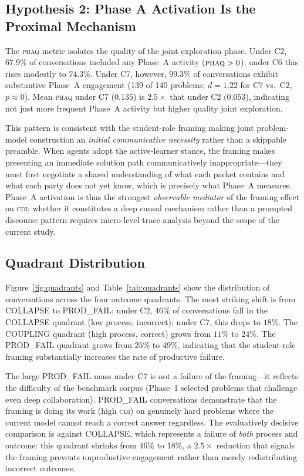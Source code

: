 \documentclass{article}
\newcommand{\CDI}{\textsc{cdi}}
\newcommand{\PhAQ}{\textsc{phaq}}
\begin{document}
\subsection{Hypothesis 2: Phase A Activation Is the Proximal Mechanism}

The \PhAQ{} metric isolates the quality of the joint exploration
phase. Under C2, $67.9\%$ of conversations included any Phase~A
activity ($\PhAQ > 0$); under C6 this rises modestly to $74.3\%$.
Under C7, however, $99.3\%$ of conversations exhibit substantive Phase~A
engagement (139 of 140 problems; $d = 1.22$ for C7 vs.\ C2,
$p \approx 0$). Mean \PhAQ{} under C7 ($0.135$) is $2.5\times$ that
under C2 ($0.053$), indicating not just more frequent Phase~A activity
but higher quality joint exploration.

This pattern is consistent with the student-role framing making joint
problem-model construction an \emph{initial communicative necessity}
rather than a skippable preamble. When agents adopt the active-learner
stance, the framing makes presenting an immediate solution path
communicatively inappropriate---they must first negotiate a shared
understanding of what each packet contains and what each party does not
yet know, which is precisely what Phase~A measures. Phase~A activation
is thus the strongest \emph{observable mediator} of the framing effect
on \CDI{}; whether it constitutes a deep causal mechanism rather than
a prompted discourse pattern requires micro-level trace analysis beyond
the scope of the current study.

\subsection{Quadrant Distribution}

Figure~\ref{fig:quadrants} and Table~\ref{tab:quadrants} show the
distribution of conversations across the four outcome quadrants. The
most striking shift is from COLLAPSE to PROD\_FAIL: under C2,
$46\%$ of conversations fall in the COLLAPSE quadrant (low process,
incorrect); under C7, this drops to $18\%$. The COUPLING quadrant
(high process, correct) grows from $11\%$ to $24\%$. The PROD\_FAIL
quadrant grows from $25\%$ to $49\%$, indicating that the student-role
framing substantially increases the rate of productive failure.

The large PROD\_FAIL mass under C7 is not a failure of the
framing---it reflects the difficulty of the benchmark corpus
(Phase~1 selected problems that challenge even deep collaboration).
PROD\_FAIL conversations demonstrate that the framing is doing its
work (high \CDI) on genuinely hard problems where the current model
cannot reach a correct answer regardless. The evaluatively decisive
comparison is against COLLAPSE, which represents a failure of
\emph{both} process and outcome: this quadrant shrinks from $46\%$ to
$18\%$, a $2.5\times$ reduction that signals the framing prevents
unproductive engagement rather than merely redistributing incorrect
outcomes.
\end{document}
